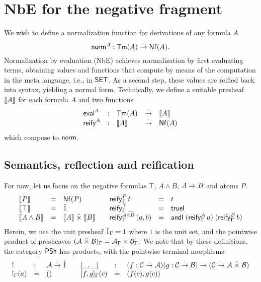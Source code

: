 \documentclass[a4paper]{article}
\begin{document}
\section{NbE for the negative fragment}

We wish to define a normalization function for derivations of any
formula $A$
\[
  \mathsf{norm}^A : \mathsf{Tm}(A)_{} \stackrel{\cdot}{\to} \mathsf{Nf}(A)_{} .
\]
Normalization by evaluation (NbE) achieves normalization by first
evaluating terms, obtaining values and functions that compute by means
of the computation in the meta language, i.e., in $\mathsf{SET}$.  As a second
step, these values are reified back into syntax, yielding a normal
form.  Technically, we define a suitable presheaf $\mathopen{{[\kern-0.14em[}} A \mathclose{{]\kern-0.14em]}}$ for each
formula $A$ and two functions
\[
\begin{array}{lllll}
  \mathsf{eval}^A & : & \mathsf{Tm}(A)_{}  & \stackrel{\cdot}{\to} & \mathopen{{[\kern-0.14em[}} A \mathclose{{]\kern-0.14em]}} \\
  \mathsf{reify}^A  & : & \mathopen{{[\kern-0.14em[}} A \mathclose{{]\kern-0.14em]}} & \stackrel{\cdot}{\to} & \mathsf{Nf}(A)_{} \\
\end{array}
\]
which compose to $\mathsf{norm}$.

\subsection{Semantics, reflection and reification}

For now, let us focus on the negative
formulas $\top$, $A \land B$, $A \Rightarrow B$ and atoms $P$.
\[
\begin{array}{lll@{\qquad}lll}
  \den P & = & \Nf P
    & \reify[\Gamma] P t & = & t \\
  \den \top & = & \hatone
    & \reify[\Gamma] \top \_ & = & \trueI \\
  \den{A \land B} & = & \den A \hattimes \den B
    & \reify[\Gamma]{A \land B} {(a,b)} & = & \andIPP {\reify[\Gamma] A a} {\reify[\Gamma] B b} \\
\end{array}
\]
Herein, we use the unit presheaf $\hat{1}_\Gamma = 1$ where $1$ is the
unit set, and the pointwise product of presheaves
$(\mathcal{A} \mathrel{\hat{\times}} \mathcal{B})_\Gamma = \mathcal{A}_\Gamma \times \mathcal{B}_\Gamma$.  We note that
by these definitions, the category $\mathsf{PSh}$ has products, with the
pointwise terminal morphisms:
\[
\begin{array}{lll@{\qquad}lll}
   ! & : & \A \todot \hatone &
     [\_,\_] & : & (f : \C \todot \A) (g : \C \todot \B) \to (\C
                   \todot \A \hattimes \B) \\
   !_\Gamma(a) & = & ()       &
     [f,g]_\Gamma(c) & = & (f(c),g(c)) \\
\end{array}
\]
\end{document}
